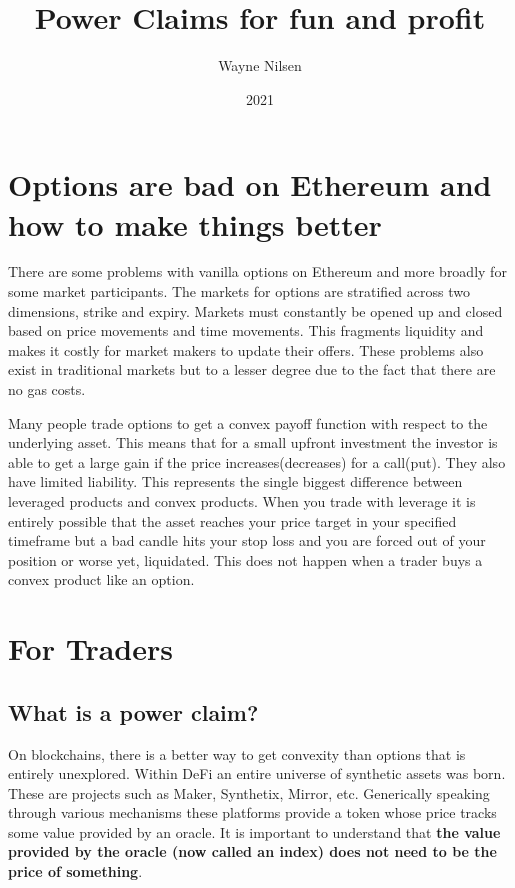 \documentclass[12pt]{article}
\title{Power Claims for fun and profit}
\author{Wayne Nilsen}
\date{2021}
\begin{document}
    \maketitle


    \section{Options are bad on Ethereum and how to make things better}

    There are some problems with vanilla options on Ethereum and more broadly for some market participants. The markets for options are stratified across two dimensions, strike and expiry. Markets must constantly be opened up and closed based on price movements and time movements. This fragments liquidity and makes it costly for market makers to update their offers. These problems also exist in traditional markets but to a lesser degree due to the fact that there are no gas costs.

    Many people trade options to get a convex payoff function with respect to the underlying asset. This means that for a small upfront investment the investor is able to get a large gain if the price increases(decreases) for a call(put). They also have limited liability. This represents the single biggest difference between leveraged products and convex products. When you trade with leverage it is entirely possible that the asset reaches your price target in your specified timeframe but a bad candle hits your stop loss and you are forced out of your position or worse yet, liquidated. This does not happen when a trader buys a convex product like an option.


    \section{For Traders}

    \subsection{What is a power claim?}

    On blockchains, there is a better way to get convexity than options that is entirely unexplored. Within DeFi an entire universe of synthetic assets was born. These are projects such as Maker, Synthetix, Mirror, etc. Generically speaking through various mechanisms these platforms provide a token whose price tracks some value provided by an oracle. It is important to understand that \textbf{the value provided by the oracle (now called an index) does not need to be the price of something}.
\end{document}
